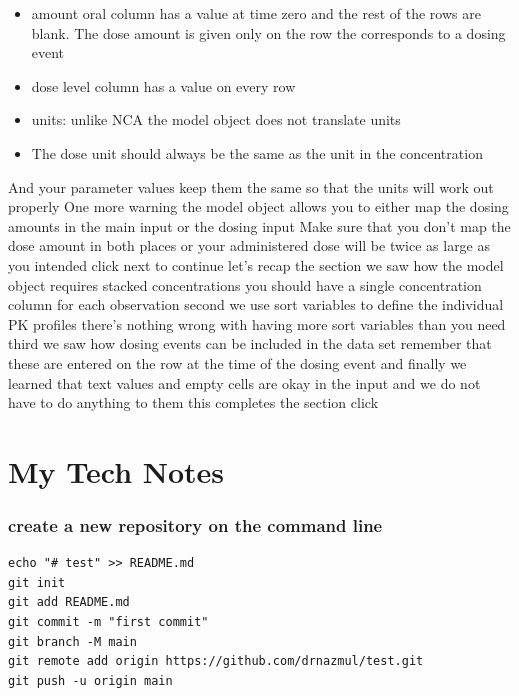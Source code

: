 \documentclass[
  letterpaper,
  DIV=11,
  numbers=noendperiod]{scrreprt}
\providecommand{\tightlist}{%
  \setlength{\itemsep}{0pt}\setlength{\parskip}{0pt}}\usepackage{longtable,booktabs,array}
\begin{document}
\begin{itemize}
\tightlist
\item
  amount oral column has a value at time zero and the rest of the rows
  are blank. The dose amount is given only on the row the corresponds to
  a dosing event
\item
  dose level column has a value on every row
\item
  units: unlike NCA the model object does not translate units\\
\item
  The dose unit should always be the same as the unit in the
  concentration
\end{itemize}

And your parameter values keep them the same so that the units will work
out properly One more warning the model object allows you to either map
the dosing amounts in the main input or the dosing input Make sure that
you don't map the dose amount in both places or your administered dose
will be twice as large as you intended click next to continue let's
recap the section we saw how the model object requires stacked
concentrations you should have a single concentration column for each
observation second we use sort variables to define the individual PK
profiles there's nothing wrong with having more sort variables than you
need third we saw how dosing events can be included in the data set
remember that these are entered on the row at the time of the dosing
event and finally we learned that text values and empty cells are okay
in the input and we do not have to do anything to them this completes
the section click


\hypertarget{my-tech-notes}{%
\chapter{My Tech Notes}\label{my-tech-notes}}

\hypertarget{create-a-new-repository-on-the-command-line}{%
\subsection{create a new repository on the command
line}\label{create-a-new-repository-on-the-command-line}}

\begin{verbatim}
echo "# test" >> README.md
git init
git add README.md
git commit -m "first commit"
git branch -M main
git remote add origin https://github.com/drnazmul/test.git
git push -u origin main
\end{verbatim}
\end{document}
